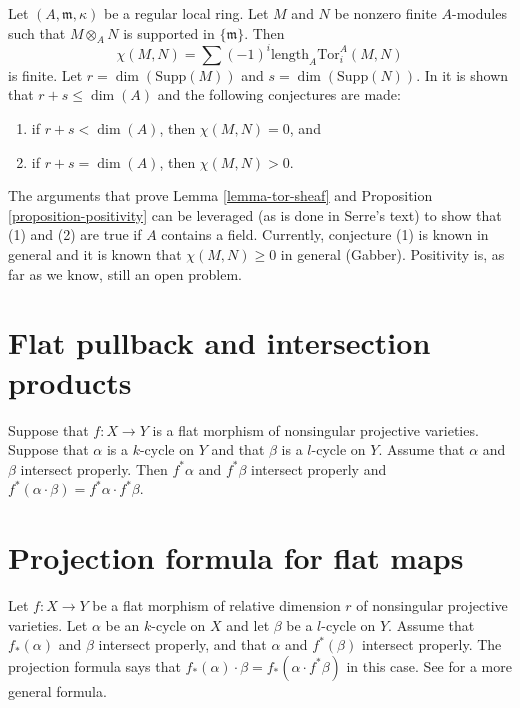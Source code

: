 \begin{remark}
\label{remark-Serre-conjectures}
Let $(A, \mathfrak m, \kappa)$ be a regular local ring.
Let $M$ and $N$ be nonzero finite $A$-modules such that $M \otimes_A N$
is supported in $\{\mathfrak m\}$. Then
$$
\chi(M, N) = \sum (-1)^i \text{length}_A \text{Tor}_i^A(M, N)
$$
is finite. Let $r = \dim(\text{Supp}(M))$ and $s = \dim(\text{Supp}(N))$.
In \cite{Serre_algebre_locale} it is shown that $r + s \leq \dim(A)$
and the following conjectures are made:
\begin{enumerate}
\item if $r + s < \dim(A)$, then $\chi(M, N) = 0$, and
\item if $r + s = \dim(A)$, then $\chi(M, N) > 0$.
\end{enumerate}
The arguments that prove Lemma \ref{lemma-tor-sheaf} and
Proposition \ref{proposition-positivity} can be leveraged
(as is done in Serre's text) to show that (1) and (2) are
true if $A$ contains a field. Currently, conjecture (1) is known
in general and it is known that $\chi(M, N) \geq 0$ in general (Gabber).
Positivity is, as far as we know, still an open problem.
\end{remark}





\section{Flat pullback and intersection products}
\label{section-flat-pullback-and-intersection-products}

\noindent
Suppose that $f : X \to Y$ is a flat morphism of nonsingular
projective varieties. Suppose that $\alpha$ is a $k$-cycle
on $Y$ and that $\beta$ is a $l$-cycle on $Y$. Assume that
$\alpha$ and $\beta$ intersect properly. Then $f^*\alpha$
and $f^*\beta$ intersect properly and $f^*( \alpha \cdot \beta )
= f^*\alpha \cdot f^*\beta$.

\section{Projection formula for flat maps}
\label{section-projection-formula-flat}

\noindent
Let $f : X \to Y$ be a flat morphism
of relative dimension $r$ of nonsingular projective varieties.
Let $\alpha$ be an $k$-cycle on $X$ and let $\beta$ be a $l$-cycle
on $Y$. Assume that $f_*(\alpha)$ and $\beta$ intersect properly,
and that $\alpha$ and $f^*(\beta)$ intersect properly. The projection
formula says that $f_*(\alpha) \cdot \beta =
f_*( \alpha \cdot f^*\beta)$ in this case.
See \cite[Chapter V, Section 7, formula (10)]{Serre_algebre_locale}
for a more general formula.

